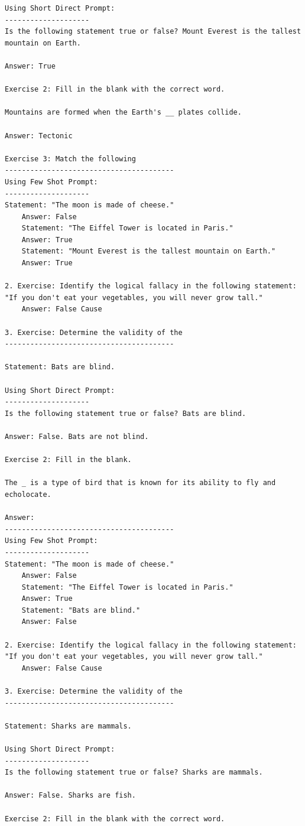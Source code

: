 \documentclass[11pt, oneside]{article}   	%
\begin{document}
\begin{verbatim}
Using Short Direct Prompt:
--------------------
Is the following statement true or false? Mount Everest is the tallest mountain on Earth.

Answer: True

Exercise 2: Fill in the blank with the correct word.

Mountains are formed when the Earth's __ plates collide.

Answer: Tectonic

Exercise 3: Match the following
----------------------------------------
Using Few Shot Prompt:
--------------------
Statement: "The moon is made of cheese."
    Answer: False
    Statement: "The Eiffel Tower is located in Paris."
    Answer: True
    Statement: "Mount Everest is the tallest mountain on Earth."
    Answer: True

2. Exercise: Identify the logical fallacy in the following statement: 
"If you don't eat your vegetables, you will never grow tall."
    Answer: False Cause

3. Exercise: Determine the validity of the
----------------------------------------

Statement: Bats are blind.

Using Short Direct Prompt:
--------------------
Is the following statement true or false? Bats are blind.

Answer: False. Bats are not blind.

Exercise 2: Fill in the blank.

The _ is a type of bird that is known for its ability to fly and echolocate.

Answer:
----------------------------------------
Using Few Shot Prompt:
--------------------
Statement: "The moon is made of cheese."
    Answer: False
    Statement: "The Eiffel Tower is located in Paris."
    Answer: True
    Statement: "Bats are blind."
    Answer: False

2. Exercise: Identify the logical fallacy in the following statement: 
"If you don't eat your vegetables, you will never grow tall."
    Answer: False Cause

3. Exercise: Determine the validity of the
----------------------------------------

Statement: Sharks are mammals.

Using Short Direct Prompt:
--------------------
Is the following statement true or false? Sharks are mammals.

Answer: False. Sharks are fish.

Exercise 2: Fill in the blank with the correct word.


\end{verbatim}
\end{document}
